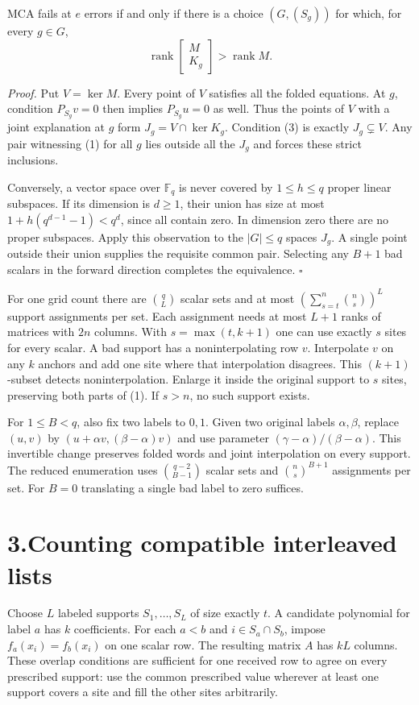 \documentclass[11pt,letterpaper]{article}
\newcommand{\F}{\mathbb F_q}
\newcommand{\rank}{\operatorname{rank}}
\newcommand{\head}[1]{\vspace{.2em}{\large\bfseries\color{ink}#1}\par}
\begin{document}
\head{Theorem 1.}
MCA fails at $e$ errors if and only if there is a choice $(G,(S_g))$ for which, for every $g\in G$,
\[
 \rank \begin{bmatrix}M\\K_g\end{bmatrix}>\rank M .
 \tag{3}
\]

\textit{Proof.} Put $V=\ker M$. Every point of $V$ satisfies all the folded equations. At $g$, condition $P_{S_g}v=0$ then implies $P_{S_g}u=0$ as well. Thus the points of $V$ with a joint explanation at $g$ form $J_g=V\cap\ker K_g$. Condition (3) is exactly $J_g\subsetneq V$. Any pair witnessing (1) for all $g$ lies outside all the $J_g$ and forces these strict inclusions.

Conversely, a vector space over $\F$ is never covered by $1\le h\le q$ proper linear subspaces. If its dimension is $d\ge1$, their union has size at most $1+h(q^{d-1}-1)<q^d$, since all contain zero. In dimension zero there are no proper subspaces. Apply this observation to the $|G|\le q$ spaces $J_g$. A single point outside their union supplies the requisite common pair. Selecting any $B+1$ bad scalars in the forward direction completes the equivalence. \hfill$\square$

For one grid count there are $\binom qL$ scalar sets and at most $(\sum_{s=t}^n\binom ns)^L$ support assignments per set. Each assignment needs at most $L+1$ ranks of matrices with $2n$ columns. With $s=\max(t,k+1)$ one can use exactly $s$ sites for every scalar. A bad support has a noninterpolating row $v$. Interpolate $v$ on any $k$ anchors and add one site where that interpolation disagrees. This $(k+1)$-subset detects noninterpolation. Enlarge it inside the original support to $s$ sites, preserving both parts of (1). If $s>n$, no such support exists.

For $1\le B<q$, also fix two labels to $0,1$. Given two original labels $\alpha,\beta$, replace $(u,v)$ by $(u+\alpha v,(\beta-\alpha)v)$ and use parameter $(\gamma-\alpha)/(\beta-\alpha)$. This invertible change preserves folded words and joint interpolation on every support. The reduced enumeration uses $\binom{q-2}{B-1}$ scalar sets and $\binom ns^{B+1}$ assignments per set. For $B=0$ translating a single bad label to zero suffices.

\newpage
\section*{3.\quad Counting compatible interleaved lists}
Choose $L$ labeled supports $S_1,\ldots,S_L$ of size exactly $t$. A candidate polynomial for label $a$ has $k$ coefficients. For each $a<b$ and $i\in S_a\cap S_b$, impose $f_a(x_i)=f_b(x_i)$ on one scalar row. The resulting matrix $A$ has $kL$ columns. These overlap conditions are sufficient for one received row to agree on every prescribed support: use the common prescribed value wherever at least one support covers a site and fill the other sites arbitrarily.
\end{document}
